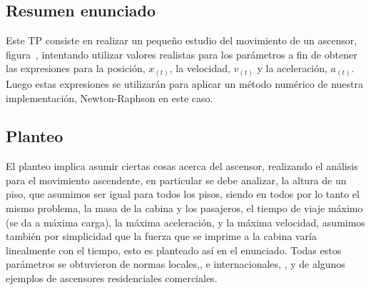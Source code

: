 
\subsection{Resumen enunciado}



\normalfont

Este TP consiste en realizar un pequeño estudio del movimiento de un ascensor, figura~, intentando utilizar valores realistas para los parámetros a fin de obtener las expresiones para la posición, $x_{(t)}$, la velocidad, $v_{(t)}$ y la aceleración, $a_{(t)}$. Luego estas expresiones se utilizarán para aplicar un método numérico de nuestra implementación, Newton-Raphson en este caso.





\subsection{Planteo}

El planteo implica asumir ciertas cosas acerca del ascensor, realizando el análisis para el movimiento ascendente, en particular se debe analizar, la altura de un piso, que asumimos ser igual para todos los pisos, siendo en todos por lo tanto el mismo problema, la masa de la cabina y los pasajeros, el tiempo de viaje máximo (se da a máxima carga), la máxima aceleración, y la máxima velocidad, asumimos también por simplicidad que la fuerza que se imprime a la cabina varía linealmente con el tiempo, esto es planteado así en el enunciado. Todas estos parámetros se obtuvieron de normas locales,, e internacionales, , y de algunos ejemplos de ascensores residenciales comerciales.



